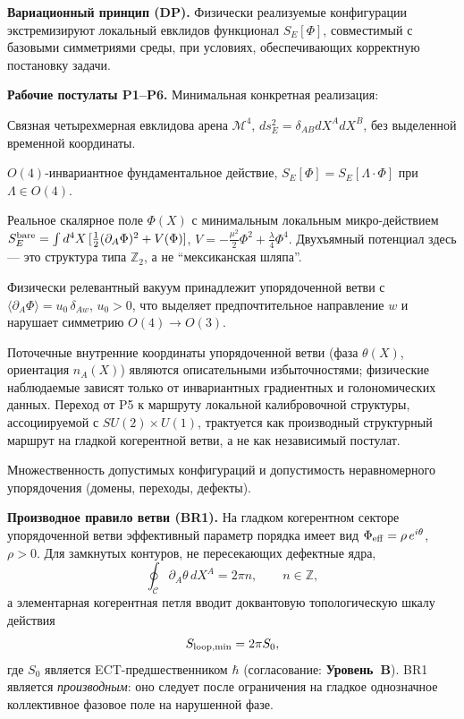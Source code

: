 \documentclass[11pt,a4paper]{article}
\newcommand{\statB}{\textbf{Уровень~B}}
\begin{document}
\textbf{Вариационный принцип (DP).}
Физически реализуемые конфигурации экстремизируют локальный
евклидов функционал $S_E[\Phi]$, совместимый с базовыми
симметриями среды, при условиях, обеспечивающих корректную
постановку задачи.

\textbf{Рабочие постулаты P1--P6.}
Минимальная конкретная реализация:
\begin{description}[leftmargin=1.4em,itemsep=2pt]
\item[P1] Связная четырехмерная евклидова арена
      $\mathcal{M}^4$, $ds^2_E=\delta_{AB}dX^AdX^B$, без
      выделенной временной координаты.
\item[P2] $O(4)$-инвариантное фундаментальное действие,
      $S_E[\Phi]=S_E[\Lambda\cdot\Phi]$ при $\Lambda\in O(4)$.
\item[P3] Реальное скалярное поле $\Phi(X)$ с минимальным
      локальным микро-действием
      $S_E^{\rm bare}=\int d^4X\,[\tfrac{1}{2}(\partial_A\Phi)^2
        + V(\Phi)]$,
      $V=-\tfrac{\mu^2}{2}\Phi^2+\tfrac{\lambda}{4}\Phi^4$.
      Двухъямный потенциал здесь — это структура типа
      $\mathbb{Z}_2$, а не ``мексиканская шляпа''.
\item[P4] Физически релевантный вакуум принадлежит упорядоченной
      ветви с $\langle\partial_A\Phi\rangle=u_0\,\delta_{Aw}$,
      $u_0>0$, что выделяет предпочтительное направление $w$ и
      нарушает симметрию $O(4)\to O(3)$.
\item[P5] Поточечные внутренние координаты упорядоченной ветви
      (фаза $\theta(X)$, ориентация $n_A(X)$) являются
      описательными избыточностями; физические наблюдаемые зависят
      только от инвариантных градиентных и голономических данных.
      Переход от P5 к маршруту локальной калибровочной структуры,
      ассоциируемой с $SU(2)\times U(1)$, трактуется как
      производный структурный маршрут на гладкой когерентной
      ветви, а не как независимый постулат.
\item[P6] Множественность допустимых конфигураций и допустимость
      неравномерного упорядочения (домены, переходы, дефекты).
\end{description}

\textbf{Производное правило ветви (BR1).}
На гладком когерентном секторе упорядоченной ветви эффективный
параметр порядка имеет вид
$\Phi_{\rm eff}=\rho\,e^{i\theta}$, $\rho>0$.
Для замкнутых контуров, не пересекающих дефектные ядра,
\begin{equation}
  \label{eq:winding}
  \oint_{\mathcal C}\partial_A\theta\,dX^A = 2\pi n,
  \qquad n\in\mathbb{Z},
\end{equation}
а элементарная когерентная петля вводит доквантовую
топологическую шкалу действия
\begin{equation}
  \label{eq:loop_action}
  S_{\rm loop,min}=2\pi S_0,
\end{equation}
где $S_0$ является ECT-предшественником $\hbar$
(согласование: \statB).
BR1 является \emph{производным}: оно следует после ограничения на
гладкое однозначное коллективное фазовое поле на нарушенной фазе.
\end{document}
